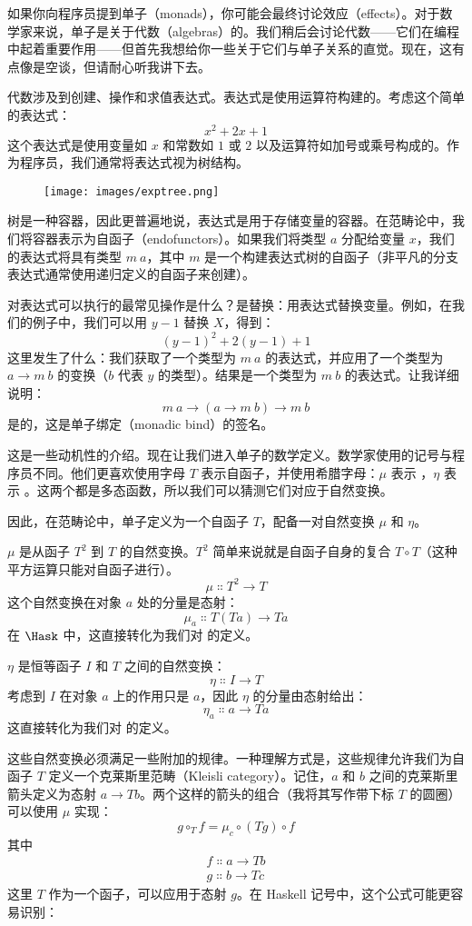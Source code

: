 
\lettrine[lhang=0.17]{如}{果你向程序员提到}单子（monads），你可能会最终讨论效应（effects）。对于数学家来说，单子是关于代数（algebras）的。我们稍后会讨论代数——它们在编程中起着重要作用——但首先我想给你一些关于它们与单子关系的直觉。现在，这有点像是空谈，但请耐心听我讲下去。

代数涉及到创建、操作和求值表达式。表达式是使用运算符构建的。考虑这个简单的表达式：
\[x^2 + 2 x + 1\]
这个表达式是使用变量如 $x$ 和常数如 $1$ 或 $2$ 以及运算符如加号或乘号构成的。作为程序员，我们通常将表达式视为树结构。

\begin{figure}[H]
  \centering
  \texttt{[image: images/exptree.png]}
\end{figure}

\noindent
树是一种容器，因此更普遍地说，表达式是用于存储变量的容器。在范畴论中，我们将容器表示为自函子（endofunctors）。如果我们将类型 $a$ 分配给变量 $x$，我们的表达式将具有类型 $m\ a$，其中 $m$ 是一个构建表达式树的自函子（非平凡的分支表达式通常使用递归定义的自函子来创建）。

对表达式可以执行的最常见操作是什么？是替换：用表达式替换变量。例如，在我们的例子中，我们可以用 $y - 1$ 替换 $X$，得到：
\[(y - 1)^2 + 2 (y - 1) + 1\]
这里发生了什么：我们获取了一个类型为 $m\ a$ 的表达式，并应用了一个类型为 $a \to m\ b$ 的变换（$b$ 代表 $y$ 的类型）。结果是一个类型为 $m\ b$ 的表达式。让我详细说明：
\[m\ a \to (a \to m\ b) \to m\ b\]
是的，这是单子绑定（monadic bind）的签名。

这是一些动机性的介绍。现在让我们进入单子的数学定义。数学家使用的记号与程序员不同。他们更喜欢使用字母 $T$ 表示自函子，并使用希腊字母：$\mu$ 表示 ，$\eta$ 表示 。这两个都是多态函数，所以我们可以猜测它们对应于自然变换。

因此，在范畴论中，单子定义为一个自函子 $T$，配备一对自然变换 $\mu$ 和 $\eta$。

$\mu$ 是从函子 $T^2$ 到 $T$ 的自然变换。$T^2$ 简单来说就是自函子自身的复合 $T \circ T$（这种平方运算只能对自函子进行）。
\[\mu \Colon T^2 \to T\]
这个自然变换在对象 $a$ 处的分量是态射：
\[\mu_a \Colon T (T a) \to T a\]
在 $\Hask$ 中，这直接转化为我们对  的定义。

$\eta$ 是恒等函子 $I$ 和 $T$ 之间的自然变换：
\[\eta \Colon I \to T\]
考虑到 $I$ 在对象 $a$ 上的作用只是 $a$，因此 $\eta$ 的分量由态射给出：
\[\eta_a \Colon a \to T a\]
这直接转化为我们对  的定义。

这些自然变换必须满足一些附加的规律。一种理解方式是，这些规律允许我们为自函子 $T$ 定义一个克莱斯里范畴（Kleisli category）。记住，$a$ 和 $b$ 之间的克莱斯里箭头定义为态射 $a \to T b$。两个这样的箭头的组合（我将其写作带下标 $T$ 的圆圈）可以使用 $\mu$ 实现：
\[g \circ_T f = \mu_c \circ (T g) \circ f\]
其中
\begin{gather*}
  f \Colon a \to T b \\
  g \Colon b \to T c
\end{gather*}
这里 $T$ 作为一个函子，可以应用于态射 $g$。在 Haskell 记号中，这个公式可能更容易识别：

